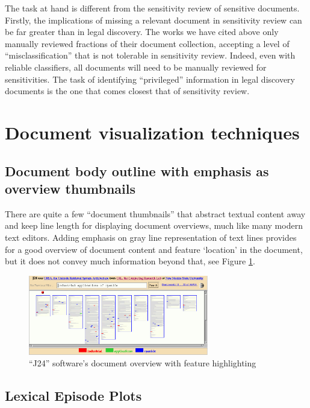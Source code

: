 \documentclass{l4proj}
\begin{document}
The task at hand is different from the sensitivity review of sensitive documents.
Firstly, the implications of missing a relevant document in sensitivity review can be far greater than in legal discovery.
The works we have cited above only manually reviewed fractions of their document collection, accepting a level of ``misclassification'' that is not tolerable in sensitivity review.
Indeed, even with reliable classifiers, all documents will need to be manually reviewed for sensitivities.
The task of identifying ``privileged'' information in legal discovery documents is the one that comes closest that of sensitivity review.

\section{Document visualization techniques}

\subsection{Document body outline with emphasis as overview thumbnails}

There are quite a few ``document thumbnails'' that abstract textual content away and keep line length for displaying document overviews, much like many modern text editors. Adding emphasis on gray line representation of text lines provides for a good overview of document content and feature `location' in the document, but it does not convey much information beyond that, see Figure \ref{fig:j24}.

\begin{figure}[H]
    \centering
    \includegraphics[width=0.7\textwidth]{images/document_visualization/j24.png}
    \caption{``J24'' software's document overview with feature highlighting \\ \protect\autocite{ogdenDocumentThumbnailVisualizations1998a}}
    \label{fig:j24}
\end{figure}

\subsection{Lexical Episode Plots}
\end{document}
